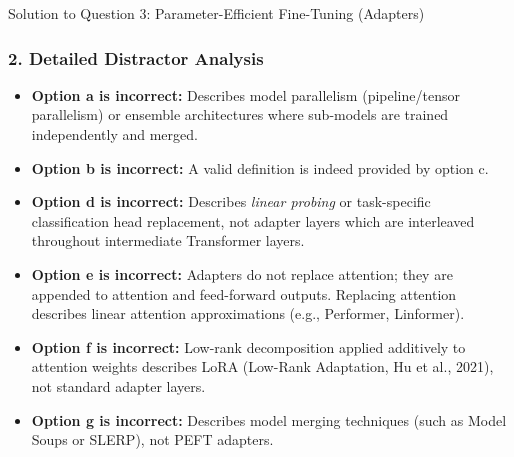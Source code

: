 \documentclass[11pt,a4paper]{article}
\begin{document}
\begin{solutionbox}{Solution to Question 3: Parameter-Efficient Fine-Tuning (Adapters)}
\subsubsection*{2. Detailed Distractor Analysis}
\begin{itemize}[itemsep=2pt]
    \item \textbf{Option a is incorrect:} Describes model parallelism (pipeline/tensor parallelism) or ensemble architectures where sub-models are trained independently and merged.
    \item \textbf{Option b is incorrect:} A valid definition is indeed provided by option c.
    \item \textbf{Option d is incorrect:} Describes \textit{linear probing} or task-specific classification head replacement, not adapter layers which are interleaved throughout intermediate Transformer layers.
    \item \textbf{Option e is incorrect:} Adapters do not replace attention; they are appended to attention and feed-forward outputs. Replacing attention describes linear attention approximations (e.g., Performer, Linformer).
    \item \textbf{Option f is incorrect:} Low-rank decomposition applied additively to attention weights describes LoRA (Low-Rank Adaptation, Hu et al., 2021), not standard adapter layers.
    \item \textbf{Option g is incorrect:} Describes model merging techniques (such as Model Soups or SLERP), not PEFT adapters.
\end{itemize}
\end{solutionbox}

\vspace{10pt}
\end{document}
